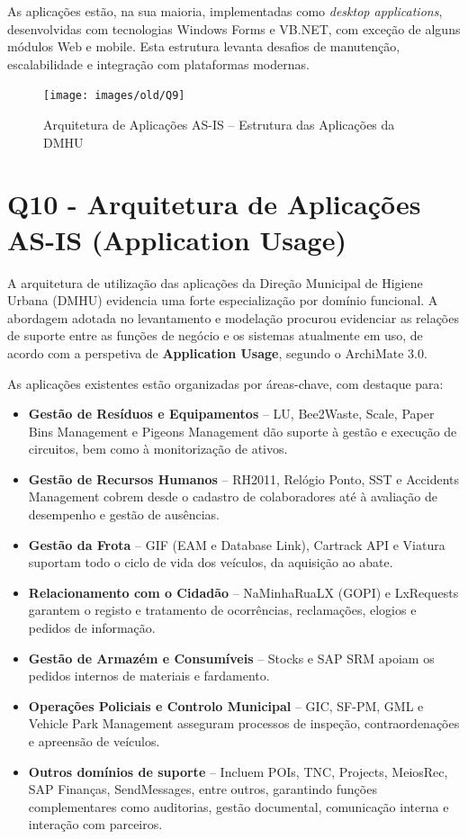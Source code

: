 \documentclass[12pt,a4paper,final]{article}
\begin{document}
    As aplicações estão, na sua maioria, implementadas como \textit{desktop applications}, desenvolvidas com tecnologias Windows Forms e VB.NET, com exceção de alguns módulos Web e mobile.
    Esta estrutura levanta desafios de manutenção, escalabilidade e integração com plataformas modernas.

    \vspace{0.5cm}
    \begin{figure}[H]
        \centering
        \texttt{[image: images/old/Q9]}
        \caption{Arquitetura de Aplicações AS-IS – Estrutura das Aplicações da DMHU}
        \label{fig:q9-as-is-structure}
    \end{figure}

    \section*{Q10 - Arquitetura de Aplicações AS-IS (Application Usage)}

    A arquitetura de utilização das aplicações da Direção Municipal de Higiene Urbana (DMHU) evidencia uma forte especialização por domínio funcional. A abordagem adotada no levantamento e modelação procurou evidenciar as relações de suporte entre as funções de negócio e os sistemas atualmente em uso, de acordo com a perspetiva de \textbf{Application Usage}, segundo o ArchiMate 3.0.

    As aplicações existentes estão organizadas por áreas-chave, com destaque para:

    \begin{itemize}
        \item \textbf{Gestão de Resíduos e Equipamentos} – LU, Bee2Waste, Scale, Paper Bins Management e Pigeons Management dão suporte à gestão e execução de circuitos, bem como à monitorização de ativos.
        \item \textbf{Gestão de Recursos Humanos} – RH2011, Relógio Ponto, SST e Accidents Management cobrem desde o cadastro de colaboradores até à avaliação de desempenho e gestão de ausências.
        \item \textbf{Gestão da Frota} – GIF (EAM e Database Link), Cartrack API e Viatura suportam todo o ciclo de vida dos veículos, da aquisição ao abate.
        \item \textbf{Relacionamento com o Cidadão} – NaMinhaRuaLX (GOPI) e LxRequests garantem o registo e tratamento de ocorrências, reclamações, elogios e pedidos de informação.
        \item \textbf{Gestão de Armazém e Consumíveis} – Stocks e SAP SRM apoiam os pedidos internos de materiais e fardamento.
        \item \textbf{Operações Policiais e Controlo Municipal} – GIC, SF-PM, GML e Vehicle Park Management asseguram processos de inspeção, contraordenações e apreensão de veículos.
        \item \textbf{Outros domínios de suporte} – Incluem POIs, TNC, Projects, MeiosRec, SAP Finanças, SendMessages, entre outros, garantindo funções complementares como auditorias, gestão documental, comunicação interna e interação com parceiros.
    \end{itemize}
\end{document}
